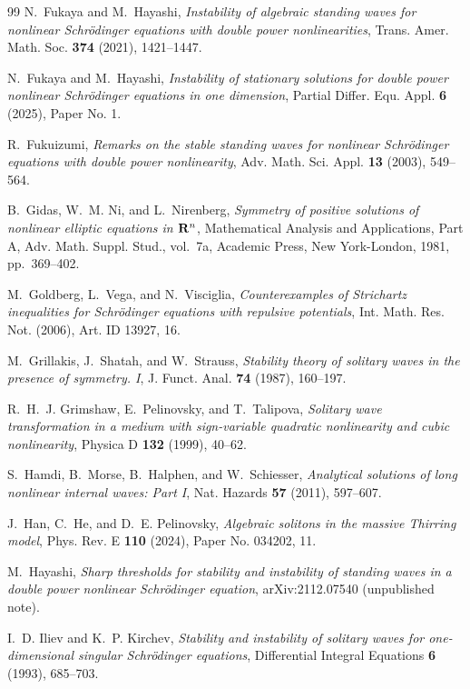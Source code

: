\documentclass[12pt, a4paper, reqno]{amsart}
\numberwithin{equation}{section}
\theoremstyle{definition}
\theoremstyle{remark}
\begin{document}
\begin{thebibliography}{99}
N.~Fukaya and M.~Hayashi,
\emph{Instability of algebraic standing waves for nonlinear {{Schr\"odinger}}
  equations with double power nonlinearities},
Trans. Amer. Math. Soc. \textbf{374} (2021), 1421--1447.

N.~Fukaya and M.~Hayashi,
\emph{Instability of stationary solutions for double power nonlinear
  {{Schr\"odinger}} equations in one dimension},
Partial Differ. Equ. Appl. \textbf{6} (2025), Paper No. 1.

R.~Fukuizumi,
\emph{Remarks on the stable standing waves for nonlinear {{Schr\"odinger}}
  equations with double power nonlinearity},
Adv. Math. Sci. Appl. \textbf{13} (2003), 549--564.

B.~Gidas, W.~M. Ni, and L.~Nirenberg,
\emph{Symmetry of positive solutions of nonlinear elliptic equations in {${\bf
  R}^{n}$}},
Mathematical Analysis and Applications, {{Part A}}, Adv. {{Math}}. {{Suppl}}.
  {{Stud}}., vol.~7a, Academic Press, New York-London, 1981, pp.~369--402.

M.~Goldberg, L.~Vega, and N.~Visciglia,
\emph{Counterexamples of {{Strichartz}} inequalities for {{Schr\"odinger}}
  equations with repulsive potentials},
Int. Math. Res. Not. (2006), Art. ID 13927, 16.

M.~Grillakis, J.~Shatah, and W.~Strauss,
\emph{Stability theory of solitary waves in the presence of symmetry. {{I}}},
J. Funct. Anal. \textbf{74} (1987), 160--197.

R.~H.~J. Grimshaw, E.~Pelinovsky, and T.~Talipova,
\emph{Solitary wave transformation in a medium with sign-variable quadratic
  nonlinearity and cubic nonlinearity},
Physica D \textbf{132} (1999), 40--62.

S.~Hamdi, B.~Morse, B.~Halphen, and W.~Schiesser,
\emph{Analytical solutions of long nonlinear internal waves: {{Part I}}},
Nat. Hazards \textbf{57} (2011), 597--607.

J.~Han, C.~He, and D.~E. Pelinovsky,
\emph{Algebraic solitons in the massive {{Thirring}} model},
Phys. Rev. E \textbf{110} (2024), Paper No. 034202, 11.

M.~Hayashi,
\emph{Sharp thresholds for stability and instability of standing waves in a
  double power nonlinear {{Schr\"odinger}} equation},
arXiv:2112.07540 (unpublished note).

I.~D. Iliev and K.~P. Kirchev,
\emph{Stability and instability of solitary waves for one-dimensional singular
  {{Schr\"odinger}} equations},
Differential Integral Equations \textbf{6} (1993), 685--703.


\end{thebibliography}
\end{document}
